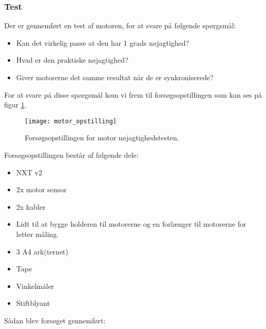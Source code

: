\subsubsection{Test}
Der er gennemført en test af motoren, for at svare på følgende spørgsmål:

\begin{itemize}
\item Kan det virkelig passe at den har 1 grads nøjagtighed?
\item Hvad er den praktiske nøjagtighed?
\item Giver motorerne det samme resultat når de er synkroniserede?
\end{itemize}

For at svare på disse spørgsmål kom vi frem til forsøgsopstillingen som kan ses på figur \ref{sensor:motor_sensor_opstilling}.

\begin{figure}[h]
\centering
\texttt{[image: motor\_opstilling]} 	
\caption{Forsøgsopstillingen for motor nøjagtighedstesten.}
\label{sensor:motor_sensor_opstilling}
\end{figure}

Forsøgsopstillingen består af følgende dele:
\begin{itemize}
\item NXT v2
\item 2x \legoms motor sensor
\item 2x \legoms kabler
\item Lidt \lego til at bygge holderen til motorerne og en forlænger til motorerne for letter måling.
\item 3 A4 ark(ternet)
\item Tape
\item Vinkelmåler
\item Stiftblyant
\end{itemize}

Sådan blev forsøget gennemført:

